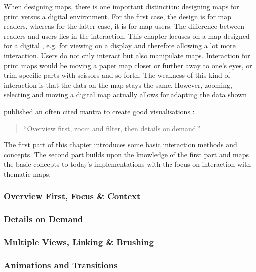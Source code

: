 When designing maps, there is one important distinction: designing maps for print versus a digital environment. For the first case, the design is for map readers, whereas for the latter case, it is for map users. The difference between readers and users lies in the interaction. This chapter focuses on a map designed for a digital , e.g. for viewing on a display and therefore allowing a lot more interaction. Users do not only interact but also manipulate maps. Interaction for print maps would be moving a paper map closer or further away to one's eyes, or trim specific parts with scissors and so forth. The weakness of this kind of interaction is that the data on the map stays the same. However, zooming, selecting and moving a digital map actually allows for adapting the data shown .

\citeauthor{Shneiderman1996} published an often cited mantra to create good visualisations :
\begin{quote}
``Overview first, zoom and filter, then details on demand.''
\end{quote}

The first part of this chapter introduces some basic interaction methods and concepts. The second part builds upon the knowledge of the first part and maps the basic concepts to today's implementations with the focus on interaction with thematic maps.

\subsubsection{Overview First, Focus \& Context}


\subsubsection{Details on Demand}


\subsubsection{Multiple Views, Linking \& Brushing}
\label{s:linking-brushing}


\subsubsection{Animations and Transitions}


